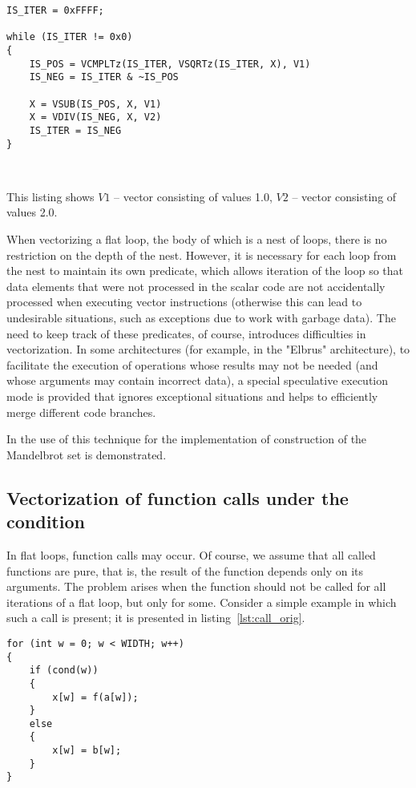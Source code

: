 \documentclass[
11pt,%
tightenlines,%
twoside,%
onecolumn,%
nofloats,%
nobibnotes,%
nofootinbib,%
superscriptaddress,%
noshowpacs,%
centertags]%
{revtex4}
\begin{document}
\begin{lstlisting}[caption={The vector form of a flat loop containing a loop with a non-constant number of iterations},label={lst:while_loop_vec}]
IS_ITER = 0xFFFF;

while (IS_ITER != 0x0)
{
    IS_POS = VCMPLTz(IS_ITER, VSQRTz(IS_ITER, X), V1)
    IS_NEG = IS_ITER & ~IS_POS
    
    X = VSUB(IS_POS, X, V1)
    X = VDIV(IS_NEG, X, V2)
    IS_ITER = IS_NEG
}
\end{lstlisting}

\

This listing shows $V1$ -- vector consisting of values 1.0, $V2$ -- vector consisting of values 2.0.

When vectorizing a flat loop, the body of which is a nest of loops, there is no restriction on the depth of the nest.
However, it is necessary for each loop from the nest to maintain its own predicate, which allows iteration of the loop so that data elements that were not processed in the scalar code are not accidentally processed when executing vector instructions (otherwise this can lead to undesirable situations, such as exceptions due to work with garbage data).
The need to keep track of these predicates, of course, introduces difficulties in vectorization.
In some architectures (for example, in the "Elbrus" architecture), to facilitate the execution of operations whose results may not be needed (and whose arguments may contain incorrect data), a special speculative execution mode is provided that ignores exceptional situations and helps to efficiently merge different code branches.

In \cite{Krzikalla} the use of this technique for the implementation of construction of the Mandelbrot set is demonstrated.

\subsection{Vectorization of function calls under the condition}

In flat loops, function calls may occur.
Of course, we assume that all called functions are pure, that is, the result of the function depends only on its arguments.
The problem arises when the function should not be called for all iterations of a flat loop, but only for some.
Consider a simple example in which such a call is present; it is presented in listing~\ref{lst:call_orig}.

\begin{lstlisting}[caption={Example of a flat loop with a function call under the condition},label={lst:call_orig}]
for (int w = 0; w < WIDTH; w++)
{
    if (cond(w))
    {
        x[w] = f(a[w]);
    }
    else
    {
        x[w] = b[w];
    }
}
\end{lstlisting}
\end{document}
